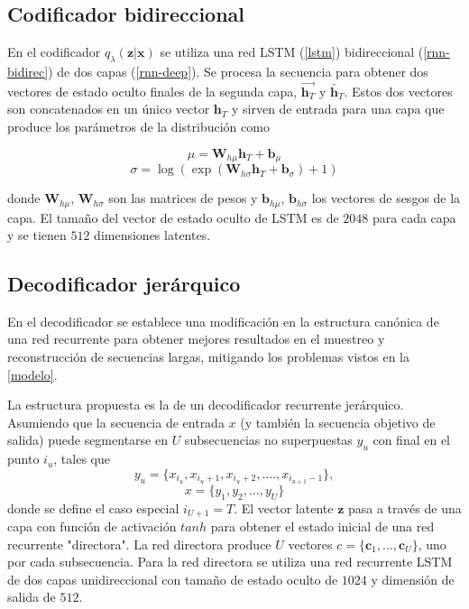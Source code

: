 \subsection{Codificador bidireccional}

En el codificador $q_{\lambda}(\textbf{z}\vert \textbf{x})$ se utiliza una red LSTM (\autoref{lstm}) bidireccional (\autoref{rnn-bidirec}) de dos capas (\autoref{rnn-deep}). Se procesa la secuencia para obtener dos vectores de estado oculto finales de la segunda capa, $\overrightarrow{\textbf{h}_T}$ y $\overleftarrow{\textbf{h}_T}$. Estos dos vectores son concatenados en un único vector $\textbf{h}_T$ y sirven de entrada para una capa que produce los parámetros de la distribución como

$$\mu = \textbf{W}_{h\mu}\textbf{h}_T + \textbf{b}_\mu$$
$$\sigma = \log (\exp (\textbf{W}_{h \sigma}\textbf{h}_T + \textbf{b}_{\sigma})+1)$$

donde $\textbf{W}_{h\mu}$, $\textbf{W}_{h\sigma}$ son las matrices de pesos y $\textbf{b}_{h\mu}$, $\textbf{b}_{h\sigma}$ los vectores de sesgos de la capa. El tamaño del vector de estado oculto de LSTM es de $2048$ para cada capa y se tienen $512$ dimensiones latentes.

\subsection{Decodificador jerárquico}

En el decodificador se establece una modificación en la estructura canónica de una red recurrente para obtener mejores resultados en el muestreo y reconstrucción de secuencias largas, mitigando los problemas vistos en la \autoref{modelo}.

La estructura propuesta es la de un decodificador recurrente jerárquico. Asumiendo que la secuencia de entrada $x$ (y también la secuencia objetivo de salida) puede segmentarse en $U$ subsecuencias no superpuestas $y_u$ con final en el punto $i_u$, tales que $$y_u = \{ x_{i_u}, x_{i_u + 1}, x_{i_u + 2},....,x_{i_{u + 1}-1}\},$$ $$x = \{y_1, y_2, ..., y_U \} $$ donde se define el caso especial $i_{U+1} = T$. El vector latente $\textbf{z}$ pasa a través de una capa con función de activación $tanh$ para obtener el estado inicial de una red recurrente "directora". La red directora produce $U$ vectores $c = \{ \textbf{c}_1,...,\textbf{c}_U\}$, uno por cada subsecuencia. Para la red directora se utiliza una red recurrente LSTM de dos capas unidireccional con tamaño de estado oculto de $1024$ y dimensión de salida de $512$.

